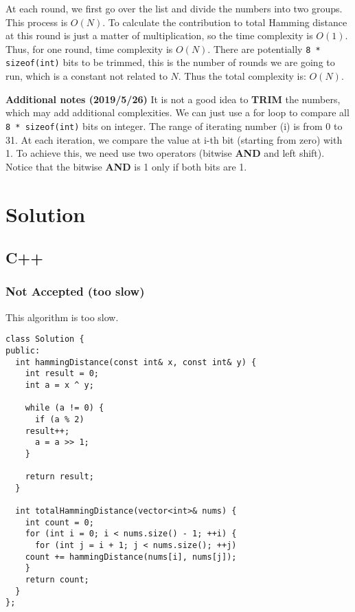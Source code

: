 \documentclass[12pt]{book}
\begin{document}
At each round, we first go over the list and divide the numbers into two groups. This process is \(O(N)\). To calculate the contribution to total Hamming distance at this round is just a matter of multiplication, so the time complexity is \(O(1)\). Thus, for one round, time complexity is \(O(N)\). There are potentially \texttt{8 * sizeof(int)} bits to be trimmed, this is the number of rounds we are going to run, which is a constant not related to \(N\). Thus the total complexity is: \(O(N)\).

\textbf{Additional notes (2019/5/26)} It is not a good idea to \textbf{TRIM} the numbers, which may add additional complexities. We can just use a for loop to compare all \texttt{8 * sizeof(int)} bits on integer. The range of iterating number (i) is from 0 to 31. At each iteration, we compare the value at i-th bit (starting from zero) with 1. To achieve this, we need use two operators (bitwise \textbf{AND} and left shift). Notice that the bitwise \textbf{AND} is 1 only if both bits are 1.
\section{Solution}
\label{sec:org874df3e}
\subsection{C++}
\label{sec:org145d32f}
\subsubsection{Not Accepted (too slow)}
\label{sec:orgb97cf70}
This algorithm is too slow.
\begin{verbatim}
class Solution {
public:
  int hammingDistance(const int& x, const int& y) {
    int result = 0;
    int a = x ^ y;

    while (a != 0) {
      if (a % 2)
	result++;
      a = a >> 1;
    }

    return result;
  }  

  int totalHammingDistance(vector<int>& nums) {
    int count = 0;
    for (int i = 0; i < nums.size() - 1; ++i) {
      for (int j = i + 1; j < nums.size(); ++j)
	count += hammingDistance(nums[i], nums[j]);
    }
    return count;
  }
};
\end{verbatim}
\end{document}
